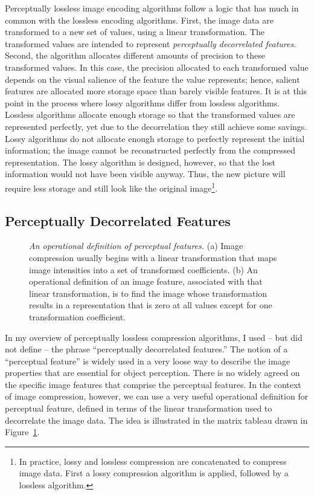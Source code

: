 Perceptually lossless image encoding algorithms follow a logic that
has much in common with the lossless encoding algorithms.  First, the
image data are transformed to a new set of values, using a linear
transformation.  The transformed values are intended to represent {\em
perceptually decorrelated features}.  Second, the algorithm allocates
different amounts of precision to these transformed values.  In this
case, the precision allocated to each transformed value depends on the
visual salience of the feature the value represents; hence, salient
features are allocated more storage space than barely visible
features.  It is at this point in the process where lossy algorithms
differ from lossless algorithms.  Lossless algorithms allocate enough
storage so that the transformed values are represented perfectly, yet
due to the decorrelation they still achieve some savings.  Lossy
algorithms do not allocate enough storage to perfectly represent the
initial information; the image cannot be reconstructed perfectly from
the compressed representation.  The lossy algorithm is designed,
however, so that the lost information would not have been visible
anyway.  Thus, the new picture will require less storage and still
look like the original image\footnote{ In practice, lossy and lossless
compression are concatenated to compress image data. First a lossy
compression algorithm is applied, followed by a lossless algorithm.}.


\subsection*{Perceptually Decorrelated Features}
\begin{figure}
\centerline {
   }
\caption[Image features: Matrix Tableau]{ {\em An operational
definition of perceptual features.}  (a) Image compression usually
begins with a linear transformation that maps image intensities into a
set of transformed coefficients.  (b) An operational definition of an
image feature, associated with that linear transformation, is to find
the image whose transformation results in a representation that is
zero at all values except for one transformation coefficient.  }
\label{f7:features}
\end{figure} In my overview of perceptually lossless compression
algorithms, I used -- but did not define -- the phrase ``perceptually
decorrelated features.''  The notion of a ``perceptual feature'' is
widely used in a very loose way to describe the image properties that
are essential for object perception.  There is no widely agreed on the
specific image features that comprise the perceptual features.  In the
context of image compression, however, we can use a very useful
operational definition for perceptual feature, defined in terms of the
linear transformation used to decorrelate the image data.  The idea is
illustrated in the matrix tableau drawn in Figure~\ref{f7:features}.

